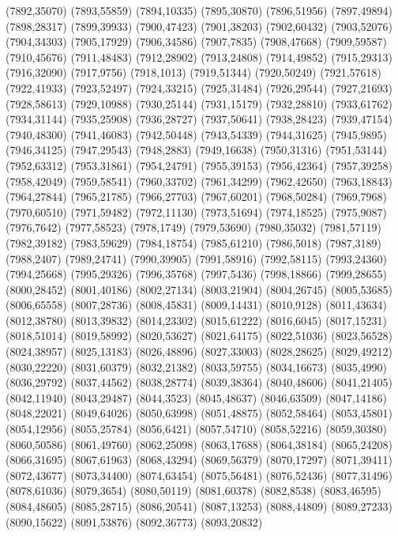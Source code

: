 (7892,35070)
(7893,55859)
(7894,10335)
(7895,30870)
(7896,51956)
(7897,49894)
(7898,28317)
(7899,39933)
(7900,47423)
(7901,38203)
(7902,60432)
(7903,52076)
(7904,34303)
(7905,17929)
(7906,34586)
(7907,7835)
(7908,47668)
(7909,59587)
(7910,45676)
(7911,48483)
(7912,28902)
(7913,24808)
(7914,49852)
(7915,29313)
(7916,32090)
(7917,9756)
(7918,1013)
(7919,51344)
(7920,50249)
(7921,57618)
(7922,41933)
(7923,52497)
(7924,33215)
(7925,31484)
(7926,29544)
(7927,21693)
(7928,58613)
(7929,10988)
(7930,25144)
(7931,15179)
(7932,28810)
(7933,61762)
(7934,31144)
(7935,25908)
(7936,28727)
(7937,50641)
(7938,28423)
(7939,47154)
(7940,48300)
(7941,46083)
(7942,50448)
(7943,54339)
(7944,31625)
(7945,9895)
(7946,34125)
(7947,29543)
(7948,2883)
(7949,16638)
(7950,31316)
(7951,53144)
(7952,63312)
(7953,31861)
(7954,24791)
(7955,39153)
(7956,42364)
(7957,39258)
(7958,42049)
(7959,58541)
(7960,33702)
(7961,34299)
(7962,42650)
(7963,18843)
(7964,27844)
(7965,21785)
(7966,27703)
(7967,60201)
(7968,50284)
(7969,7968)
(7970,60510)
(7971,59482)
(7972,11130)
(7973,51694)
(7974,18525)
(7975,9087)
(7976,7642)
(7977,58523)
(7978,1749)
(7979,53690)
(7980,35032)
(7981,57119)
(7982,39182)
(7983,59629)
(7984,18754)
(7985,61210)
(7986,5018)
(7987,3189)
(7988,2407)
(7989,24741)
(7990,39905)
(7991,58916)
(7992,58115)
(7993,24360)
(7994,25668)
(7995,29326)
(7996,35768)
(7997,5436)
(7998,18866)
(7999,28655)
(8000,28452)
(8001,40186)
(8002,27134)
(8003,21904)
(8004,26745)
(8005,53685)
(8006,65558)
(8007,28736)
(8008,45831)
(8009,14431)
(8010,9128)
(8011,43634)
(8012,38780)
(8013,39832)
(8014,23302)
(8015,61222)
(8016,6045)
(8017,15231)
(8018,51014)
(8019,58992)
(8020,53627)
(8021,64175)
(8022,51036)
(8023,56528)
(8024,38957)
(8025,13183)
(8026,48896)
(8027,33003)
(8028,28625)
(8029,49212)
(8030,22220)
(8031,60379)
(8032,21382)
(8033,59755)
(8034,16673)
(8035,4990)
(8036,29792)
(8037,44562)
(8038,28774)
(8039,38364)
(8040,48606)
(8041,21405)
(8042,11940)
(8043,29487)
(8044,3523)
(8045,48637)
(8046,63509)
(8047,14186)
(8048,22021)
(8049,64026)
(8050,63998)
(8051,48875)
(8052,58464)
(8053,45801)
(8054,12956)
(8055,25784)
(8056,6421)
(8057,54710)
(8058,52216)
(8059,30380)
(8060,50586)
(8061,49760)
(8062,25098)
(8063,17688)
(8064,38184)
(8065,24208)
(8066,31695)
(8067,61963)
(8068,43294)
(8069,56379)
(8070,17297)
(8071,39411)
(8072,43677)
(8073,34400)
(8074,63454)
(8075,56481)
(8076,52436)
(8077,31496)
(8078,61036)
(8079,3654)
(8080,50119)
(8081,60378)
(8082,8538)
(8083,46595)
(8084,48605)
(8085,28715)
(8086,20541)
(8087,13253)
(8088,44809)
(8089,27233)
(8090,15622)
(8091,53876)
(8092,36773)
(8093,20832)
